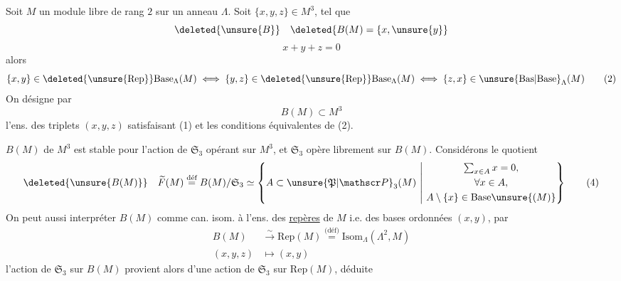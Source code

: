 
Soit $M$ un module libre de rang $2$ sur un anneau $\Lambda$.  Soit $\{x,y,z\}\in M^3$, tel que
\[
\deleted{\unsure{B}}\quad\deleted{B(M)=\{x,\unsure{y}}
\]
\[
x+y+z=0\tag*{(1)}
\]
alors
\[
\{x,y\}\in\deleted{\unsure{\mathrm{Rep}}}\mathrm{Base}_{\Lambda}(M)\iff\{y,z\}\in\deleted{\unsure{\mathrm{Rep}}}\mathrm{Base}_{\Lambda}(M)\iff\{z,x\}\in\unsure{\mathrm{Bas}|\mathrm{Base}}_{\Lambda}(M)\tag*{(2)}
\]
On désigne par
\[
B(M)\subset M^3\tag*{(3)}
\]
l'ens. des triplets $(x,y,z)$ satisfaisant (1)   et les conditions équivalentes de (2).

  $B(M)$ de $M^3$ est stable pour l'action de $\mathfrak{S}_3$ opérant sur $M^3$, et $\mathfrak{S}_3$ opère librement sur $B(M)$. Considérons le quotient
\[
\deleted{\unsure{B(M)}}\quad\widetilde F(M)\overset{\text{déf}}{=}B(M)/\mathfrak{S}_3\simeq
\left\{A\subset\unsure{\mathfrak P|\mathscr P}_3(M)\ \middle|\ 
\begin{gathered}\textstyle\sum_{x\in A}x=0,\\ \forall x\in A,\\ A\setminus\{x\}\in\mathrm{Base}\unsure{(M)}\end{gathered}\right\}\tag*{(4)}
\]
 On peut aussi interpréter $B(M)$ comme can. isom. à l'ens. des \uline{repères} de $M$ i.e. des bases ordonnées $(x,y)$, par
\[
\begin{aligned}
B(M)&\xrightarrow{\sim}\mathrm{Rep}(M)\overset{\text{(déf)}}{=}\mathrm{Isom}_{\Lambda}(\Lambda^2,M)\\
(x,y,z)&\longmapsto (x,y)
\end{aligned}\tag*{(5)}
\]
l'action de $\mathfrak{S}_3$ sur $B(M)$ provient alors d'une action de $\mathfrak{S}_3$ sur $\mathrm{Rep}(M)$, déduite
